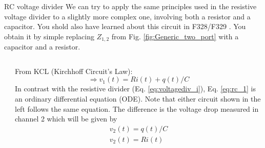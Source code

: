 \begin{frame}{RC voltage divider}
We can try to apply the same principles used in the resistive voltage divider to a slightly more complex one, involving both a resistor and a capacitor. You shold also have learned about this circuit in F328/F329 \cite{Walker:2008aa}. You obtain it by 			simple replacing $Z_{1,2}$ from Fig. \ref{fig:Generic_two_port} with a capacitor and a resistor.
	\begin{columns}
		\begin{column}{0.5\textwidth}
				\end{column}
		\begin{column}{0.5\textwidth}
		From KCL (Kirchhoff Circuit's Law):
			\begin{equation}
			\Rightarrow v_1(t)=R i(t)+  q(t)/C
			\label{eq:rc_1}
  			\end{equation}
  			In contrast with the resistive divider (Eq. \ref{eq:voltagediv_i}), Eq. \ref{eq:rc_1} is an ordinary differential equation (ODE). Note that either circuit shown in the left follows the same equation. The difference is the voltage drop measured in channel 2 which will be given by
		\begin{eqnarray}
		     v_2(t)=q(t)/C\label{eq:rc_v2c}\\
		     v_2(t)=R i(t)
  			\label{eq:rc_v2r}
		\end{eqnarray}
		
		\end{column}
	\end{columns}
\end{frame}


